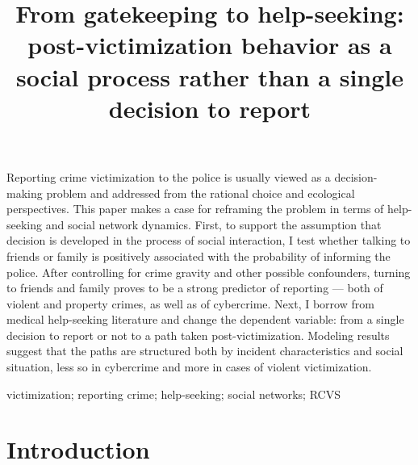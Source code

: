 \documentclass[]{interact}
\theoremstyle{plain}%
\theoremstyle{definition}
\theoremstyle{remark}
\begin{document}
	
	
	\title{From gatekeeping to help-seeking: post-victimization behavior as a social process rather than a single decision to report}
	
	\author{
	}
	
	
	\maketitle
	
	\begin{abstract}
		
	\end{abstract}
		Reporting crime victimization to the police is usually viewed as a decision-making problem and addressed from the rational choice and ecological perspectives. This paper makes a case for reframing the problem in terms of help-seeking and social network dynamics. First, to support the assumption that decision is developed in the process of social interaction, I test whether talking to friends or family is positively associated with the probability of informing the police. After controlling for crime gravity and other possible confounders, turning to friends and family proves to be a strong predictor of reporting --- both of violent and property crimes, as well as of cybercrime. Next, I borrow from medical help-seeking literature and change the dependent variable: from a single decision to report or not to a path taken post-victimization. Modeling results suggest that the paths are structured both by incident characteristics and social situation, less so in cybercrime and more in cases of violent victimization.	
	\begin{keywords}
		victimization; reporting crime; help-seeking; social networks; RCVS
	\end{keywords}
	
	\section*{Introduction}
	
\end{document}
